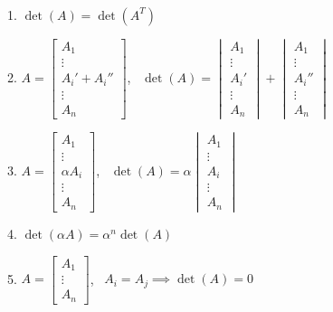 \begin{prop}~

    1. $\det(A) = \det(A^T)$

    2. $A = \begin{bmatrix}
        A_1 \\
        \vdots \\
        A_i' + A_i'' \\
        \vdots \\
        A_n
    \end{bmatrix}$,~ $\det(A) = \begin{vmatrix}
        A_1 \\
        \vdots \\
        A_i' \\
        \vdots \\
        A_n
    \end{vmatrix} + \begin{vmatrix}
        A_1 \\
        \vdots \\
        A_i'' \\
        \vdots \\
        A_n
    \end{vmatrix}$

    3. $A = \begin{bmatrix}
        A_1 \\
        \vdots \\
        \alpha A_i \\
        \vdots \\
        A_n
    \end{bmatrix}$,~ $\det(A) = \alpha \begin{vmatrix}
        A_1 \\
        \vdots \\
        A_i \\
        \vdots \\
        A_n
    \end{vmatrix}$

    4. $\det(\alpha A) = \alpha^n \det(A)$

    5. $A = \begin{bmatrix}
        A_1 \\
        \vdots \\
        A_n
    \end{bmatrix}$,~ $A_i = A_j \implies \det(A) = 0$


\end{prop}
